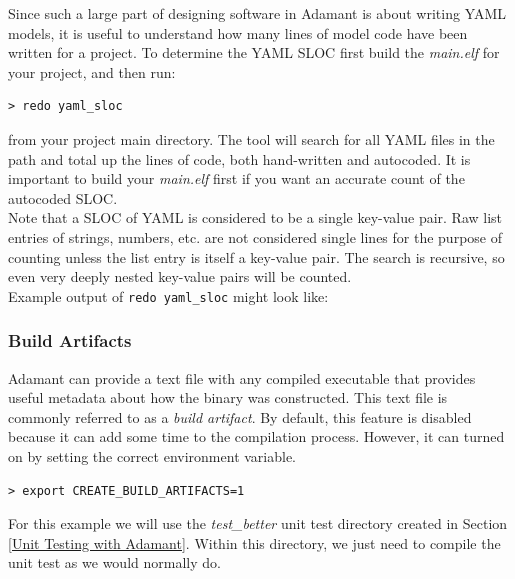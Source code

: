 Since such a large part of designing software in Adamant is about writing YAML models, it is useful to understand how many lines of model code have been written for a project. To determine the YAML SLOC first build the \textit{main.elf} for your project, and then run:

\vspace{5mm} %
\begin{verbatim}
> redo yaml_sloc
\end{verbatim}
\vspace{5mm} %

from your project main directory. The tool will search for all YAML files in the path and total up the lines of code, both hand-written and autocoded. It is important to build your \textit{main.elf} first if you want an accurate count of the autocoded SLOC.\\

Note that a SLOC of YAML is considered to be a single key-value pair. Raw list entries of strings, numbers, etc. are not considered single lines for the purpose of counting unless the list entry is itself a key-value pair. The search is recursive, so even very deeply nested key-value pairs will be counted. \\

Example output of \texttt{redo yaml\_sloc} might look like:


\subsubsection{Build Artifacts}

Adamant can provide a text file with any compiled executable that provides useful metadata about how the binary was constructed. This text file is commonly referred to as a \textit{build artifact}. By default, this feature is disabled because it can add some time to the compilation process. However, it can turned on by setting the correct environment variable.

\vspace{5mm} %
\begin{verbatim}
> export CREATE_BUILD_ARTIFACTS=1
\end{verbatim}
\vspace{5mm} %

For this example we will use the \textit{test\_better} unit test directory created in Section \ref{Unit Testing with Adamant}. Within this directory, we just need to compile the unit test as we would normally do.

